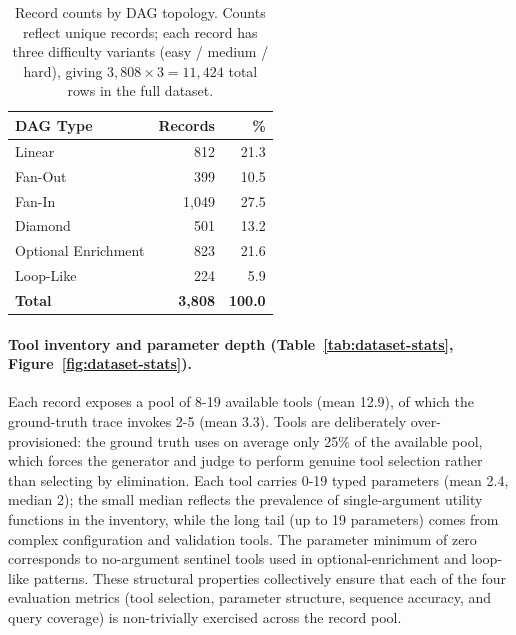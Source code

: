 \begin{table}[!htbp]
\centering
\small
\setlength{\tabcolsep}{8pt}
\renewcommand{\arraystretch}{1.2}
\begin{tabularx}{\columnwidth}{@{}Xrr@{}}
\toprule
\textbf{DAG Type} & \textbf{Records} & \textbf{\%} \\
\midrule
Linear              & \phantom{0}812  & 21.3 \\
Fan-Out             & \phantom{0}399  & 10.5 \\
Fan-In              & 1{,}049          & 27.5 \\
Diamond             & \phantom{0}501  & 13.2 \\
Optional Enrichment & \phantom{0}823  & 21.6 \\
Loop-Like           & \phantom{0}224  &  5.9 \\
\midrule
\textbf{Total}      & \textbf{3{,}808} & \textbf{100.0} \\
\bottomrule
\end{tabularx}
\caption{Record counts by DAG topology. Counts reflect unique records; each record has three difficulty variants (easy / medium / hard), giving $3{,}808 \times 3 = 11{,}424$ total rows in the full dataset.}
\label{tab:dag-counts}
\end{table}

\paragraph{Tool inventory and parameter depth (Table~\ref{tab:dataset-stats}, Figure~\ref{fig:dataset-stats}).}
Each record exposes a pool of 8-19 available tools (mean 12.9), of which the ground-truth trace invokes 2-5 (mean 3.3). Tools are deliberately over-provisioned: the ground truth uses on average only 25\% of the available pool, which forces the generator and judge to perform genuine tool selection rather than selecting by elimination. Each tool carries 0-19 typed parameters (mean 2.4, median 2); the small median reflects the prevalence of single-argument utility functions in the inventory, while the long tail (up to 19 parameters) comes from complex configuration and validation tools. The parameter minimum of zero corresponds to no-argument sentinel tools used in optional-enrichment and loop-like patterns. These structural properties collectively ensure that each of the four evaluation metrics (tool selection, parameter structure, sequence accuracy, and query coverage) is non-trivially exercised across the record pool.


